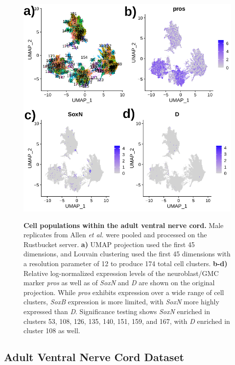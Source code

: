 \documentclass[withindex,glossary]{cam-thesis}
\begin{document}
\setcounter{figure}{20-1}
\begin{figure}[htbp]
\centering
\includegraphics[width=\textwidth]{figs/Fig20 adult brain UMAP and features.png}
\label{fig20}
\caption{\textbf{Cell populations within the adult ventral nerve cord.} Male replicates from Allen \emph{et al.} were pooled and processed on the Rustbucket server. \textbf{a)} UMAP projection used the first 45 dimensions, and Louvain clustering used the first 45 dimensions with a resolution parameter of 12 to produce 174 total cell clusters. \textbf{b-d)} Relative log-normalized expression levels of the neuroblast/GMC marker \emph{pros} as well as of \emph{SoxN} and \emph{D} are shown on the original projection. While \emph{pros} exhibits expression over a wide range of cell clusters, \emph{SoxB} expression is more limited, with \emph{SoxN} more highly expressed than \emph{D}. Significance testing shows \emph{SoxN} enriched in clusters  53, 108, 126, 135, 140, 151, 159, and 167, with \emph{D} enriched in cluster 108 as well.}
\end{figure}

\subsection{Adult Ventral Nerve Cord Dataset}
\end{document}
